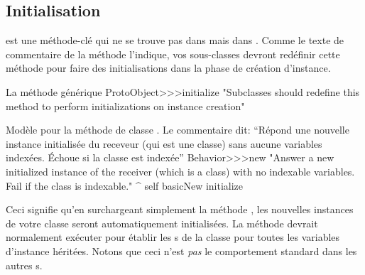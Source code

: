 \documentclass[a4paper,10pt,twoside]{book}
\begin{document}

\subsection{Initialisation}
 est une méthode-clé qui ne se
trouve pas dans  mais dans .
Comme le texte de commentaire de la méthode l'indique, vos sous-classes
devront redéfinir cette méthode pour faire des initialisations
dans la phase de création d'instance.

\begin{method}{La méthode générique }
ProtoObject>>>initialize
   "Subclasses should redefine this method to perform initializations on instance creation"
\end{method}


\begin{method}{Modèle pour la méthode de classe . Le commentaire dit: ``Répond une nouvelle instance initialisée du receveur (qui est une classe) sans aucune variables indexées. Échoue si la classe est indexée''}
Behavior>>>new
    "Answer a new initialized instance of the receiver (which is a class) with no indexable variables. Fail if the class is indexable."
    ^ self basicNew initialize
\end{method}

Ceci signifie qu'en surchargeant simplement la méthode  , les nouvelles instances de votre classe seront automatiquement initialisées. La méthode  devrait normalement exécuter  pour établir les s de la classe pour toutes les variables d'instance héritées.
Notons que ceci n'est \emph{pas} le comportement standard dans les autres \st{}s.

\end{document}
